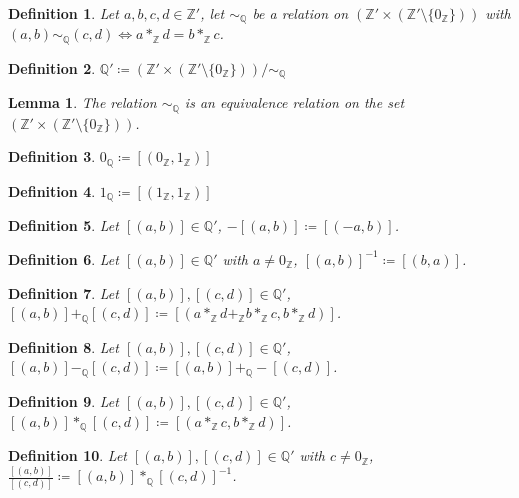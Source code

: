 \documentclass[11pt]{article}
\theoremstyle{break}
\theoremstyle{break}
\newtheorem{lem}{Lemma}[thm]
\newtheorem{defn}{Definition}[corL]
\newcommand{\Z}{\mathbb{Z}}
\newcommand{\Q}{\mathbb{Q}}
\begin{document}
	\begin{defn}
		Let $a,b,c,d \in \Z'$, let $\sim_{\Q}$ be a relation on $(\Z' \times (\Z' \setminus \{0_\Z \}))$ with $(a,b) \sim_{\Q} (c,d) \iff  a \ast_{\Z} d = b \ast_{\Z} c$.
	\end{defn}		
	
	\begin{defn}
	$\Q' \coloneqq (\Z' \times (\Z' \setminus \{0_\Z \}))/{\sim_{\Q}}$
	\end{defn}
	
	\begin{lem}
		The relation $\sim_{\Q}$ is an equivalence relation on the set $(\Z' \times (\Z' \setminus \{0_\Z \}))$.
	\end{lem}
	
	\begin{defn}
		$0_{\Q} \coloneqq [(0_{\Z},1_{\Z})]$
	\end{defn}
	
	\begin{defn}
		$1_{\Q} \coloneqq [(1_{\Z}, 1_{\Z})]$
	\end{defn}
	
	\begin{defn}
		Let $[(a,b)] \in \Q'$, $-[(a,b)] \coloneqq [(-a,b)]$.
	\end{defn}

	\begin{defn}
		Let $[(a,b)] \in \Q'$ with $a \neq 0_{\Z}$, $[(a,b)]^{-1} \coloneqq [(b,a)]$.
	\end{defn}
		
	\begin{defn}
		Let $[(a,b)],[(c,d)] \in \Q'$, $[(a,b)] +_{\Q} [(c,d)] \coloneqq [(a \ast_{\Z} d +_{\Z} b \ast_{\Z} c, b \ast_{\Z} d)]$.
	\end{defn}
	
	\begin{defn}
		Let $[(a,b)],[(c,d)] \in \Q'$, $[(a,b)] -_{\Q} [(c,d)] \coloneqq [(a,b)] +_{\Q} -[(c,d)]$.
	\end{defn}
	
	\begin{defn}
		Let $[(a,b)],[(c,d)] \in \Q'$, $[(a,b)] \ast_{\Q} [(c,d)] \coloneqq [(a \ast_{\Z} c , b \ast_{\Z} d)]$.
	\end{defn}
	
	\begin{defn}
		Let $[(a,b)],[(c,d)] \in \Q'$ with $c \neq 0_\Z$, $\frac{[(a,b)]}{[(c,d)]} \coloneqq [(a,b)] \ast_{\Q} [(c,d)]^{-1}$.
	\end{defn}
\end{document}
